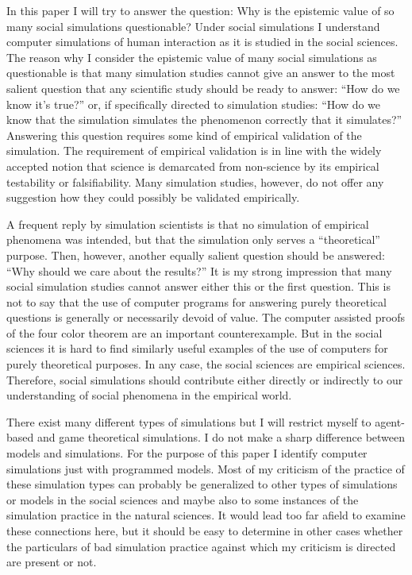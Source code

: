 \documentclass[12pt, english, a4paper]{article}
\begin{document}
In this paper I will try to answer the question: Why is the epistemic
value of so many social simulations questionable? Under social
simulations I understand computer simulations of human interaction as
it is studied in the social sciences. The reason why I consider the
epistemic value of many social simulations as questionable is that
many simulation studies cannot give an answer to the most salient
question that any scientific study should be ready to answer: “How do
we know it’s true?” or, if specifically directed to simulation
studies: “How do we know that the simulation simulates the phenomenon
correctly that it simulates?” Answering this question requires some
kind of empirical validation of the simulation. The requirement of
empirical validation is in line with the widely accepted notion that
science is demarcated from non-science by its empirical testability or
falsifiability. Many simulation studies, however, do not offer any
suggestion how they could possibly be validated empirically.

A frequent reply by simulation scientists is that no simulation of
empirical phenomena was intended, but that the simulation only serves
a “theoretical” purpose. Then, however, another equally salient
question should be answered: “Why should we care about the results?”
It is my strong impression that many social simulation studies cannot
answer either this or the first question. This is not to say that the
use of computer programs for answering purely theoretical questions is
generally or necessarily devoid of value. The computer assisted proofs
of the four color theorem \citep{wilson:2002} are an important
counterexample. But in the social sciences it is hard to find
similarly useful examples of the use of computers for purely
theoretical purposes. In any case, the social sciences are empirical
sciences. Therefore, social simulations should contribute either
directly or indirectly to our understanding of social phenomena in the
empirical world.

There exist many different types of simulations but I will restrict
myself to agent-based and game theoretical simulations.  I do not make
a sharp difference between models and simulations. For the purpose of
this paper I identify computer simulations just with programmed
models. Most of my criticism of the practice of these simulation types
can probably be generalized to other types of simulations or models in
the social sciences and maybe also to some instances of the simulation
practice in the natural sciences. It would lead too far afield to
examine these connections here, but it should be easy to determine in
other cases whether the particulars of bad simulation practice against
which my criticism is directed are present or not.
\end{document}
